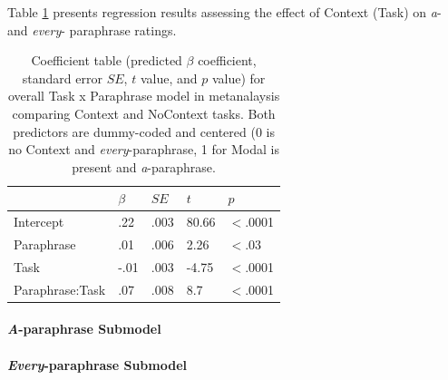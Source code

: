 \documentclass[12pt,letterpaper,table,svgnames,dvipsnames]{article}
\begin{document}
Table \ref{sub-model_Task} presents regression results assessing the effect of Context (Task) on \emph{a}- and \emph{every}- paraphrase ratings.
{}
\begin{table}
\begin{center} 
\caption{Coefficient table (predicted $\beta$ coefficient, standard error $SE$, $t$ value, and $p$ value) for overall Task x Paraphrase model in metanalaysis comparing Context and NoContext tasks. Both predictors are dummy-coded and centered (0 is no Context and \emph{every}-paraphrase, 1 for Modal is present and \emph{a}-paraphrase.} 
\label{sub-model_Task} 
\begin{tabular}{lllll} 
\toprule
{} & $\beta$ & $SE$ & $t$ & $p$\\
\midrule
Intercept & .22 & .003 & 80.66 & $<$.0001\\
Paraphrase & .01 & .006 & 2.26 & $<$.03\\
Task & -.01 & .003 & -4.75 & $<$.0001\\
Paraphrase:Task & .07 & .008 & 8.7 & $<$.0001\\
\bottomrule
\end{tabular} 
\end{center} 
\end{table}

\paragraph{\emph{A}-paraphrase Submodel}

\paragraph{\emph{Every}-paraphrase Submodel}
\end{document}
